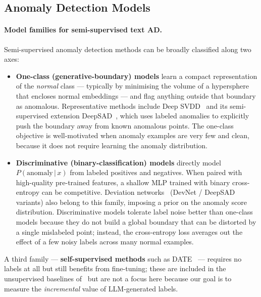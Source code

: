 \documentclass[12pt]{article}
\begin{document}
\subsection{Anomaly Detection Models}
\label{sec:models}

\paragraph{Model families for semi-supervised text AD.}
Semi-supervised anomaly detection methods can be broadly classified along two axes:
\begin{itemize}
    \item \textbf{One-class (generative-boundary) models} learn a compact 
          representation of the \emph{normal} class — typically by minimising 
          the volume of a hypersphere that encloses normal embeddings — and flag 
          anything outside that boundary as anomalous. 
          Representative methods include Deep SVDD~\cite{Ruff2018} and its 
          semi-supervised extension DeepSAD~\cite{Ruff2019}, which uses labeled 
          anomalies to explicitly push the boundary away from known anomalous 
          points. The one-class objective is well-motivated when anomaly 
          examples are very few and clean, because it does not require learning 
          the anomaly distribution.
    \item \textbf{Discriminative (binary-classification) models} directly model 
          $P(\text{anomaly}\,|\,x)$ from labeled positives and negatives. When 
          paired with high-quality pre-trained features, a shallow MLP trained 
          with binary cross-entropy can be competitive. Deviation 
          networks~\cite{Pang2019} (DevNet / DeepSAD variants) also belong to 
          this family, imposing a prior on the anomaly score distribution. 
          Discriminative models tolerate label noise better than one-class models 
          because they do not build a global boundary that can be distorted by a 
          single mislabeled point; instead, the cross-entropy loss averages out 
          the effect of a few noisy labels across many normal examples.
\end{itemize}
A third family — \textbf{self-supervised methods} such as DATE~\cite{manolache2021date} 
--- requires no labels at all but still benefits from fine-tuning; these are 
included in the unsupervised baselines of~\cite{stil} but are not a focus here 
because our goal is to measure the \emph{incremental} value of LLM-generated labels.
\end{document}
